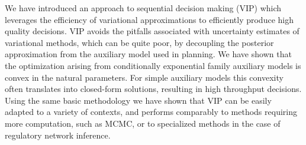 We have introduced an approach to sequential decision making (VIP)
which leverages the efficiency of variational approximations to
efficiently produce high quality decisions.  VIP avoids the pitfalls
associated with uncertainty estimates of variational methods, which
can be quite poor, by decoupling the posterior approximation from the
auxiliary model used in planning.  We have shown that the optimization
arising from conditionally exponential family auxiliary models is
convex in the natural parameters.  For simple auxiliary models this
convexity often translates into closed-form solutions, resulting in
high throughput decisions.  Using the same basic methodology we have
shown that VIP can be easily adapted to a variety of contexts, and
performs comparably to methods requiring more computation, such as
MCMC, or to specialized methods in the case of regulatory network
inference.
